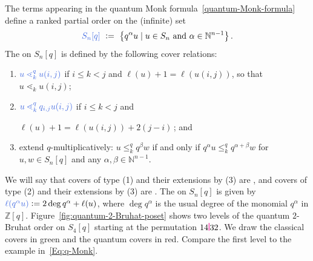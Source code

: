 \documentclass[12pt,oneside,reqno]{amsart}
\theoremstyle{definition}
\numberwithin{equation}{section}
\newcommand{\NN}{{\mathbb N}}
\newcommand{\ZZ}{{\mathbb Z}}
\newcommand{\ptsp}{\hspace{0.55pt}}
\newcommand{\p}{\raisebox{-0.5pt}{\ptsp\color{magenta}\rule{0.75pt}{9pt}}\ptsp}  %
\newcommand{\defcolor}[1]{{\color{RoyalBlue}#1}}
\newcommand{\demph}[1]{\defcolor{{\sl #1}}}
\begin{document}
The terms appearing in the quantum Monk formula~\eqref{quantum-Monk-formula} define a ranked partial order on
the (infinite) set
%
 \begin{equation*}
    \defcolor{S_n[q]}\  \vcentcolon=\  \big\{ q^\alpha u \mid u\in S_n \text{ and } \alpha\in\NN^{n-1}\big\}\,.
 \end{equation*}
%
The \demph{quantum $k$-Bruhat order $\leq_k^q$} on $S_n[q]$ is defined by the following cover relations:
\begin{enumerate}
    \item $\defcolor{u\lessdot_k^q u (i,j)}$ if $i\leq k<j$ and $\ell(u)+1=\ell(u (i,j))$,
         so that $u\lessdot_k u (i,j)$;
    \item $\defcolor{u\lessdot_k^q q_{i,j} u (i,j)}$ if $i\leq k<j$ and \rule{0pt}{13pt}
           $\ell(u)+1=\ell(u (i,j))+2(j{-}i)$\,; and
    \item extend $q$-multiplicatively:  $u\leq_k^q q^\beta w$  if and
        only if $q^{\alpha} u\leq_k^q q^{\alpha+\beta} w$ for $u,w\in S_n[q]$ and any $\alpha,\beta\in \NN^{n-1}$. \rule{0pt}{13pt} \vspace{2pt}
\end{enumerate}
We will say that covers of type (1) and their extensions by (3) are \demph{classical}, and covers of type (2) and their
extensions by (3) are \demph{quantum}. 
The \demph{rank function $\ell$} on $S_n[q]$ is given by
$\defcolor{\ell(q^\alpha u)} \vcentcolon= 2 \deg q^\alpha + \ell(u)$, where $\deg q^\alpha$ is the usual degree of the 
monomial $q^\alpha$ in $\ZZ[q]$.
Figure~\ref{fig:quantum-2-Bruhat-poset} shows two levels of the quantum $2$-Bruhat order on $S_4[q]$ starting at the
permutation $14\p32$.
We draw the classical covers in green
and the quantum covers in red.
Compare the first level to the example in~\eqref{Eq:q-Monk}.
\end{document}
